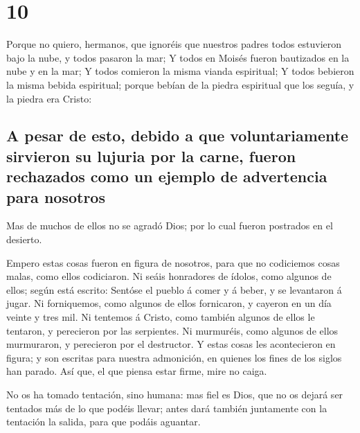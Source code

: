 \hypertarget{section-46-10}{%
\section{10}\label{section-46-10}}

 Porque no quiero, hermanos, que ignoréis que nuestros
padres todos estuvieron bajo la nube, y todos pasaron la mar;
 Y todos en Moisés fueron bautizados en la nube y en la
mar;  Y todos comieron la misma vianda espiritual;
 Y todos bebieron la misma bebida espiritual; porque
bebían de la piedra espiritual que los seguía, y la piedra era Cristo:

\hypertarget{a-pesar-de-esto-debido-a-que-voluntariamente-sirvieron-su-lujuria-por-la-carne-fueron-rechazados-como-un-ejemplo-de-advertencia-para-nosotros}{%
\subsection{A pesar de esto, debido a que voluntariamente sirvieron su
lujuria por la carne, fueron rechazados como un ejemplo de advertencia
para
nosotros}\label{a-pesar-de-esto-debido-a-que-voluntariamente-sirvieron-su-lujuria-por-la-carne-fueron-rechazados-como-un-ejemplo-de-advertencia-para-nosotros}}

 Mas de muchos de ellos no se agradó Dios; por lo cual
fueron postrados en el desierto.

 Empero estas cosas fueron en figura de nosotros, para que
no codiciemos cosas malas, como ellos codiciaron.  Ni
seáis honradores de ídolos, como algunos de ellos; según está escrito:
Sentóse el pueblo á comer y á beber, y se levantaron á jugar.
 Ni forniquemos, como algunos de ellos fornicaron, y
cayeron en un día veinte y tres mil.  Ni tentemos á
Cristo, como también algunos de ellos le tentaron, y perecieron por las
serpientes.  Ni murmuréis, como algunos de ellos
murmuraron, y perecieron por el destructor.  Y estas
cosas les acontecieron en figura; y son escritas para nuestra
admonición, en quienes los fines de los siglos han parado.
 Así que, el que piensa estar firme, mire no caiga.

 No os ha tomado tentación, sino humana: mas fiel es
Dios, que no os dejará ser tentados más de lo que podéis llevar; antes
dará también juntamente con la tentación la salida, para que podáis
aguantar.

